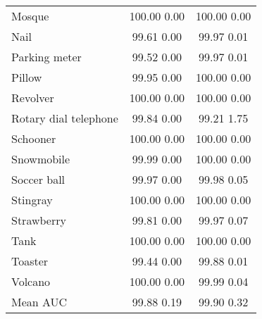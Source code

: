 \documentclass[10pt]{article} \usepackage[accepted]{stylefiles/tmlr}
\begin{document}
\begin{table*}[th]
\begin{tabular}{lcc}
Mosque & \multicolumn{1}{c|}{100.00  0.00} & \multicolumn{1}{c}{100.00  0.00} \\ 
Nail & \multicolumn{1}{c|}{99.61  0.00} & \multicolumn{1}{c}{99.97  0.01} \\ 
Parking meter & \multicolumn{1}{c|}{99.52  0.00} & \multicolumn{1}{c}{99.97  0.01} \\ 
Pillow & \multicolumn{1}{c|}{99.95  0.00} & \multicolumn{1}{c}{100.00  0.00} \\ 
Revolver & \multicolumn{1}{c|}{100.00  0.00} & \multicolumn{1}{c}{100.00  0.00} \\ 
Rotary dial telephone & \multicolumn{1}{c|}{99.84  0.00} & \multicolumn{1}{c}{99.21  1.75} \\ 
Schooner & \multicolumn{1}{c|}{100.00  0.00} & \multicolumn{1}{c}{100.00  0.00} \\ 
Snowmobile & \multicolumn{1}{c|}{99.99  0.00} & \multicolumn{1}{c}{100.00  0.00} \\ 
Soccer ball & \multicolumn{1}{c|}{99.97  0.00} & \multicolumn{1}{c}{99.98  0.05} \\ 
Stingray & \multicolumn{1}{c|}{100.00  0.00} & \multicolumn{1}{c}{100.00  0.00} \\ 
Strawberry & \multicolumn{1}{c|}{99.81  0.00} & \multicolumn{1}{c}{99.97  0.07} \\ 
Tank & \multicolumn{1}{c|}{100.00  0.00} & \multicolumn{1}{c}{100.00  0.00} \\ 
Toaster & \multicolumn{1}{c|}{99.44  0.00} & \multicolumn{1}{c}{99.88  0.01} \\ 
Volcano & \multicolumn{1}{c|}{100.00  0.00} & \multicolumn{1}{c}{99.99  0.04} \\ 
\midrule 
Mean AUC & \multicolumn{1}{c|}{99.88  0.19} & \multicolumn{1}{c}{99.90  0.32} \\ 
\bottomrule 
\end{tabular} 

 \end{table*}
\end{document}
